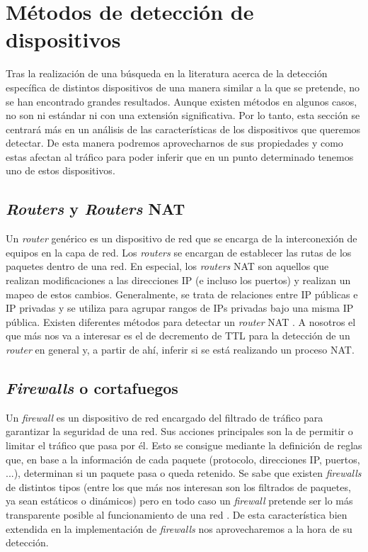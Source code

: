 \documentclass[twoside, 12pt]{epstfg}
\begin{document}
\section{Métodos de detección de dispositivos}
Tras la realización de una búsqueda en la literatura acerca de la detección específica de distintos dispositivos de una manera similar a la que se pretende, no se han encontrado grandes resultados. Aunque existen métodos en algunos casos, no son ni estándar ni con una extensión significativa. Por lo tanto, esta sección se centrará más en un análisis de las características de los dispositivos que queremos detectar. De esta manera podremos aprovecharnos de sus propiedades y como estas afectan al tráfico para poder inferir que en un punto determinado tenemos uno de estos dispositivos.

\subsection{\textit{Routers} y \textit{Routers} NAT}
Un \textit{router} genérico es un dispositivo de red que se encarga de la interconexión de equipos en la capa de red. Los \textit{routers} se encargan de establecer las rutas de los paquetes dentro de una red. En especial, los \textit{routers} NAT son aquellos que realizan modificaciones a las direcciones IP (e incluso los puertos) y realizan un mapeo de estos cambios. Generalmente, se trata de relaciones entre IP públicas e IP privadas y se utiliza para agrupar rangos de IPs privadas bajo una misma IP pública. Existen diferentes métodos para detectar un \textit{router} NAT \cite{Krmicek}. A nosotros el que más nos va a interesar es el de decremento de TTL para la detección de un \textit{router} en general y, a partir de ahí, inferir si se está realizando un proceso NAT.

\subsection{\textit{Firewalls} o cortafuegos}
\label{subsec:Estado:Deteccion:Firewalls}
Un \textit{firewall} es un dispositivo de red encargado del filtrado de tráfico para garantizar la seguridad de una red. Sus acciones principales son la de permitir o limitar el tráfico que pasa por él. Esto se consigue mediante la definición de reglas que, en base a la información de cada paquete (protocolo, direcciones IP, puertos, ...), determinan si un paquete pasa o queda retenido. Se sabe que existen \textit{firewalls} de distintos tipos (entre los que más nos interesan son los filtrados de paquetes, ya sean estáticos o dinámicos) pero en todo caso un \textit{firewall} pretende ser lo más transparente posible al funcionamiento de una red \cite{Cheswick2003}. De esta característica bien extendida en la implementación de \textit{firewalls} nos aprovecharemos a la hora de su detección.
\end{document}
